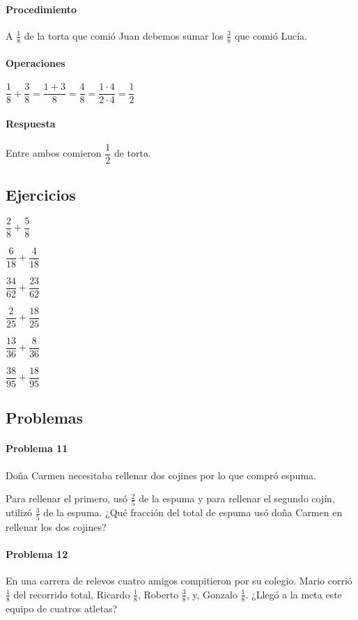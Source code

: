 \documentclass[10pt,twoside]{article}
\begin{document}
\paragraph*{Procedimiento}
A $\frac{1}{8}$ de la torta que comi\'{o} Juan debemos sumar los $\frac{3}{8}$ que comi\'{o} Luc\'{i}a.
\paragraph*{Operaciones}
$\dfrac{1}{8}+\dfrac{3}{8}=\dfrac{1+3}{8}=\dfrac{4}{8}=\dfrac{1\cdot 4}{2\cdot 4}=\dfrac{1}{2}$
\paragraph*{Respuesta}
Entre ambos comieron $\dfrac{1}{2}$ de torta.
\subsection*{Ejercicios}
\begin{enumerate}
\begin{multicols}{3}
\item $\dfrac{2}{8}+\dfrac{5}{8}$
\item $\dfrac{6}{18}+\dfrac{4}{18}$
\item $\dfrac{34}{62}+\dfrac{23}{62}$
\item $\dfrac{2}{25}+\dfrac{18}{25}$
\item $\dfrac{13}{36}+\dfrac{8}{36}$
\item $\dfrac{38}{95}+\dfrac{18}{95}$
\end{multicols}
\end{enumerate}
\subsection*{Problemas}
\paragraph*{Problema 11}
Doña Carmen necesitaba rellenar dos cojines por lo que compró espuma.

Para rellenar el primero, usó $\frac{2}{5}$ de la espuma y para rellenar el segundo cojín, utilizó $\frac{3}{5}$ de la espuma. ¿Qué fracción del total de espuma usó doña Carmen en rellenar los dos cojines?
\paragraph*{Problema 12}
En una carrera de relevos cuatro amigos compitieron por su colegio. Mario corrió $\frac{1}{8}$ del recorrido total, Ricardo $\frac{1}{8}$, Roberto $\frac{3}{8}$, y, Gonzalo $\frac{1}{8}$. ¿Llegó a la meta este equipo de cuatros atletas?
\end{document}
